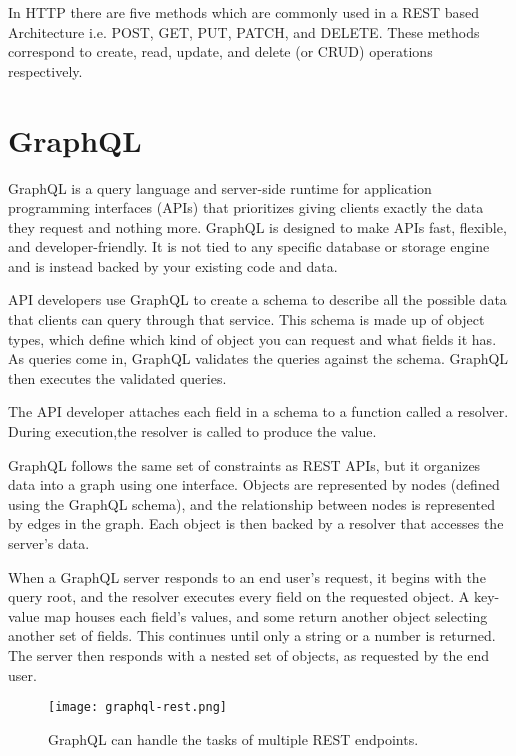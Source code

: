 In HTTP there are five methods which are commonly used in a REST based Architecture 
i.e. POST, GET, PUT, PATCH, and DELETE. These methods correspond to create, read, 
update, and delete (or CRUD) operations respectively.~\cite{GeeksRestAPI}

\section{GraphQL}

GraphQL is a query language and server-side runtime for application programming interfaces (APIs) 
that prioritizes giving clients exactly the data they request and nothing more. 
GraphQL is designed to make APIs fast, flexible, and developer-friendly. It is not tied 
to any specific database or storage engine and is instead backed by your existing code and data.

API developers use GraphQL to create a schema to describe all the possible data that clients can query 
through that service. This schema is made up of object types, which define which kind of object you can 
request and what fields it has. As queries come in, GraphQL validates the queries against the schema. 
GraphQL then executes the validated queries.

The API developer attaches each field in a schema to a function called a resolver. 
During execution,the resolver is called to produce the value.~\cite{WhatisGraphQL}

GraphQL follows the same set of constraints as REST APIs, but it organizes data into a 
graph using one interface. Objects are represented by nodes (defined using the GraphQL schema), 
and the relationship between nodes is represented by edges in the graph. Each object is then backed 
by a resolver that accesses the server’s data.

When a GraphQL server responds to an end user’s request, it begins with the query root,
and the resolver executes every field on the requested object. A key-value map houses each field’s
values, and some return another object selecting another set of fields. This continues until only a 
string or a number is returned. The server then responds with a nested set of objects, as requested by 
the end user.~\cite{RubrikGraphQL}

\begin{figure}
    \begin{center}
        \texttt{[image: graphql-rest.png]}
    \end{center}
    \caption{GraphQL can handle the tasks of multiple REST endpoints.}
    \label{fig:graphql}
\end{figure}
  
